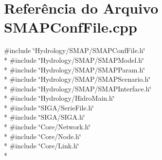 \section{Referência do Arquivo S\+M\+A\+P\+Conf\+File.\+cpp}
\label{_s_m_a_p_conf_file_8cpp}
{\ttfamily \#include \char`\"{}Hydrology/\+S\+M\+A\+P/\+S\+M\+A\+P\+Conf\+File.\+h\char`\"{}}\\*
{\ttfamily \#include \char`\"{}Hydrology/\+S\+M\+A\+P/\+S\+M\+A\+P\+Model.\+h\char`\"{}}\\*
{\ttfamily \#include \char`\"{}Hydrology/\+S\+M\+A\+P/\+S\+M\+A\+P\+Param.\+h\char`\"{}}\\*
{\ttfamily \#include \char`\"{}Hydrology/\+S\+M\+A\+P/\+S\+M\+A\+P\+Scenario.\+h\char`\"{}}\\*
{\ttfamily \#include \char`\"{}Hydrology/\+S\+M\+A\+P/\+S\+M\+A\+P\+Interface.\+h\char`\"{}}\\*
{\ttfamily \#include \char`\"{}Hydrology/\+Hidro\+Main.\+h\char`\"{}}\\*
{\ttfamily \#include \char`\"{}S\+I\+G\+A/\+Serie\+File.\+h\char`\"{}}\\*
{\ttfamily \#include \char`\"{}S\+I\+G\+A/\+S\+I\+G\+A.\+h\char`\"{}}\\*
{\ttfamily \#include \char`\"{}Core/\+Network.\+h\char`\"{}}\\*
{\ttfamily \#include \char`\"{}Core/\+Node.\+h\char`\"{}}\\*
{\ttfamily \#include \char`\"{}Core/\+Link.\+h\char`\"{}}\\*

